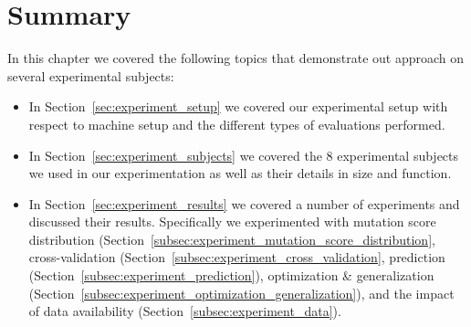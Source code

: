 \section{Summary}
\label{sec:experiment_summary}
In this chapter we covered the following topics that demonstrate out approach on several experimental subjects:

\begin{itemize}
  \item In Section~\ref{sec:experiment_setup} we covered our experimental setup with respect to machine setup and the different types of evaluations performed.
  \item In Section~\ref{sec:experiment_subjects} we covered the 8 experimental subjects we used in our experimentation as well as their details in size and function.
  \item In Section~\ref{sec:experiment_results} we covered a number of experiments and discussed their results. Specifically we experimented with mutation score distribution (Section~\ref{subsec:experiment_mutation_score_distribution}, cross-validation (Section~\ref{subsec:experiment_cross_validation}, prediction (Section~\ref{subsec:experiment_prediction}), optimization \& generalization (Section~\ref{subsec:experiment_optimization_generalization}), and the impact of data availability (Section~\ref{subsec:experiment_data}).
\end{itemize}
